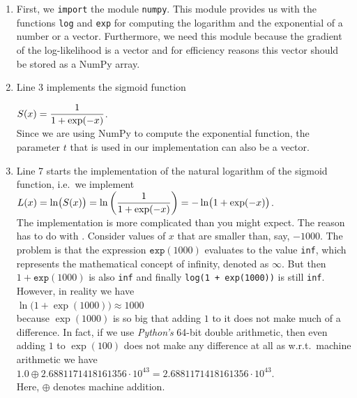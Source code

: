 \begin{enumerate}
\item First, we \texttt{import} the module \texttt{numpy}.  This module provides us with the 
      functions \texttt{log} and \texttt{exp} for computing the logarithm and the exponential of a number or
      a vector.  Furthermore, we need this module because the gradient of the log-likelihood is a vector and for
      efficiency reasons this vector should be stored as a NumPy array.
\item Line 3 implements the sigmoid function

      \hspace*{1.3cm}
      $\displaystyle S(x) = \frac{1}{1 + \exp(-x)}$.
      \\[0.2cm]
      Since we are using NumPy to compute the exponential function, the parameter $t$ that is used in our
      implementation can also be a vector.
\item Line 7 starts the implementation of the natural logarithm of the sigmoid function, i.e.~we implement
      \\[0.2cm]
      \hspace*{1.3cm}
      $\displaystyle L(x) = \ln\bigl(S(x)\bigr) = \ln\left(\frac{1}{1 + \exp(-x)}\right) =- \ln\bigl(1 + \exp(-x)\bigr)$.
      \\[0.2cm]
      The implementation is more complicated than you might expect.  The reason has to do with
      .  Consider values of $x$ that are smaller than, say, $-1000$.  The problem is that
      the expression $\mathtt{exp}(1000)$ evaluates to the value \texttt{inf}, which represents the
      mathematical concept of infinity, denoted as $\infty$.  But then $1 + \mathtt{exp}(1000)$ is also \texttt{inf} and
      finally \texttt{log(1 + exp(1000))} is still \texttt{inf}.  However, in reality we have
      \\[0.2cm]
      \hspace*{1.3cm}
      $\ln\bigl(1 + \exp(1000)\bigr) \approx 1000$
      \\[0.2cm] 
      because $\exp(1000)$ is so big that adding $1$ to it does not make much of a difference.
      In fact, if we use \textsl{Python's} 64-bit double arithmetic, then even adding $1$ to $\exp(100)$
      does not make any difference at all as w.r.t.~machine arithmetic we have
      \\[0.2cm]
      \hspace*{1.3cm}
      $1.0 \oplus 2.6881171418161356 \cdot 10^{43} = 2.6881171418161356 \cdot 10^{43}$.
      \\[0.2cm]
      Here, $\oplus$ denotes machine addition.
    

\end{enumerate}

